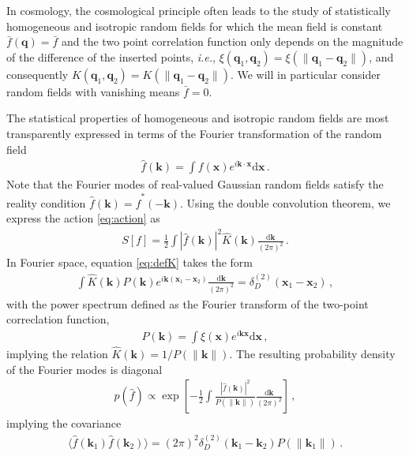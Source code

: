 \documentclass[a4paper, 11pt]{article}
\begin{document}
In cosmology, the cosmological principle often leads to the study of statistically homogeneous and isotropic random fields for which the mean field is constant $\bar{f}(\bm{q})=\bar{f}$ and the two point correlation function only depends on the magnitude of the difference of the inserted points, \textit{i.e.}, $\xi(\bm{q}_1,\bm{q}_2)=\xi(\|\bm{q}_1-\bm{q}_2\|)$, and consequently $K(\bm{q}_1,\bm{q}_2)=K(\|\bm{q}_1-\bm{q}_2\|)$. We will in particular consider random fields with vanishing means $\bar{f}=0$. 

The statistical properties of homogeneous and isotropic random fields are most transparently expressed in terms of the Fourier transformation of the random field
\begin{align}
\hat{f}(\bm{k}) = \int f(\bm{x})e^{i\bm{k}\cdot \bm{x}}\mathrm{d}\bm{x}\,.
\end{align}
Note that the Fourier modes of real-valued Gaussian random fields satisfy the reality condition $\hat{f}(\bm{k}) = \hat{f}^*(-\bm{k})$. Using the double convolution theorem, we express the action \eqref{eq:action} as
\begin{align}
S[f] = \frac{1}{2} \int |\hat{f}(\bm{k})|^2 \hat{K}(\bm{k}) \frac{\mathrm{d}\bm{k}}{(2\pi)^2}\,.
\end{align}
In Fourier space, equation \eqref{eq:defK} takes the form
\begin{align}
\int \hat{K}(\bm{k}) P(\bm{k}) e^{i\bm{k}(\bm{x}_1-\bm{x}_2)} \frac{\mathrm{d}\bm{k}}{(2\pi)^2} = \delta_D^{(2)}(\bm{x}_1 - \bm{x}_2)\,,
\end{align}
with the power spectrum defined as the Fourier transform of the two-point correclation function,
\begin{align}
P(\bm{k}) = \int \xi(\bm{x}) e^{i\bm{k}\bm{x}}\mathrm{d}\bm{x}\,,
\end{align}
implying the relation $\hat{K}(\bm{k}) = 1/P(\|\bm{k}\|)$. The resulting probability density of the Fourier modes is diagonal
\begin{align}
p(\hat{f}) \propto \exp\left[ -\frac{1}{2} \int \frac{|\hat{f}(\bm{k})|^2}{P(\|\bm{k}\|)} \frac{\mathrm{d}\bm{k}}{(2\pi)^2}\right]\,,
\end{align}
implying the covariance
\begin{align}
\langle \hat{f}(\bm{k}_1)\hat{f}(\bm{k}_2) \rangle = (2\pi)^2 \delta_D^{(2)}(\bm{k}_1-\bm{k}_2) P(\|\bm{k}_1\|)\,.
\end{align}
\end{document}

